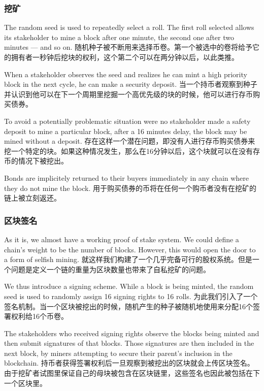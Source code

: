 \documentclass[letterpaper]{article}
\begin{document}
\subsubsection{挖矿}
The random seed is used to repeatedly select a roll. The first roll selected
allows its stakeholder to mine a block after one minute, the second one after
two minutes --- and so on. 
随机种子被不断用来选择币卷。第一个被选中的卷将给予它的拥有者一秒钟后挖块的权利，这个第二个可以在两分钟以后，以此类推。

When a stakeholder observes the seed and realizes he can mint a high priority
block in the next cycle, he can make a security deposit.
当一个持币者观察到种子并认识到他可以在下一个周期里挖掘一个高优先级的块的时候，他可以进行存币购买债券。

To avoid a potentially problematic situation were no stakeholder made a 
safety deposit to mine a particular block, after a 16 minutes delay, the
block may be mined without a deposit.
存在这样一个潜在问题，即没有人进行存币购买债券来挖一个特定的块。如果这种情况发生，那么在16分钟以后，这个块就可以在没有存币的情况下被挖出。

Bonds are implicitely returned to their buyers immediately in any chain
where they do not mine the block.
用于购买债券的币将在任何一个购币者没有在挖矿的链上被立刻返还。

\subsubsection{区块签名}
As it is, we almost have a working proof of stake system.
We could define a chain's weight to be the number of blocks.
However, this would open the door to a form of selfish mining.
就这样我们构建了一个几乎完备可行的股权系统。但是一个问题是定义一个链的重量为区块数量也带来了自私挖矿的问题。

We thus introduce a signing scheme. While a block is being minted, the random
seed is used to randomly assign 16 signing rights to 16 rolls. 
为此我们引入了一个签名机制。当一个区块被挖出的时候，随机产生的种子被随机地使用来分配16个签署权利给16个币卷。

The stakeholders who received signing rights observe the blocks being minted and
then submit signatures of that blocks. Those signatures are then included in
the next block, by miners attempting to secure their parent's inclusion in the
blockchain.
持币者获得签署权利后一旦观察到被挖出的区块就会上传区块签名。由于挖矿者试图里保证自己的母块被包含在区块链里，这些签名也因此被包括在下一个区块里。
\end{document}
